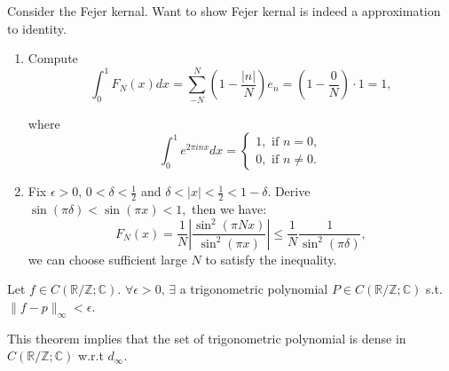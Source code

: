 \documentclass[12pt]{article}
\begin{document}
\begin{pfbox}
    Consider the Fejer kernal. Want to show Fejer kernal is indeed a approximation to identity.
\begin{enumerate}
    \item Compute 
    \[
    \int_{0}^{1}F_N(x)dx =  \sum_{-N}^{N}\left(1-\frac{|n|}{N}\right)e_n = (1-\frac{0}{N})\cdot 1 = 1,
    \]

    where
    \[
    \int_{0}^{1}e^{2\pi inx} dx = \begin{cases}
        1, \text{ if } n = 0,\\
        0, \text{ if } n \neq 0.
    \end{cases}
    \]

    \item Fix $\epsilon>0,\, 0<\delta<\frac{1}{2}$ and $\delta<|x|<\frac{1}{2}<1-\delta$.
    Derive $\sin(\pi\delta)<\sin(\pi x)<1,$ then we have:
    \[
    F_N(x) = \frac{1}{N}\left|\frac{\sin^2(\pi Nx)}{\sin^2(\pi x)}\right|\le \frac{1}{N}\frac{1}{\sin^2(\pi\delta)},
    \]
    we can choose sufficient large $N$ to satisfy the inequality.
\end{enumerate}
\end{pfbox}

\begin{theorem}
    Let $f\in C(\mathbb{R}/\mathbb{Z}; \mathbb{C})$. $\forall\epsilon>0,\,\exists$ a trigonometric polynomial $P\in C(\mathbb{R}/\mathbb{Z}; \mathbb{C})$
    s.t. $\| f-p \|_{\infty}<\epsilon$.
\end{theorem}

\begin{remark}
    This theorem implies that the set of trigonometric polynomial is dense in $C(\mathbb{R}/\mathbb{Z}; \mathbb{C})$ w.r.t $d_\infty$.
\end{remark}
\end{document}
